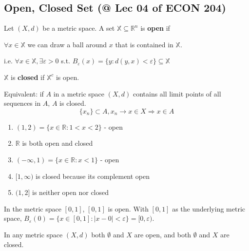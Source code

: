 \documentclass[11pt]{elegantbook}
\begin{document}
\subsection{Open, Closed Set \small{(@ Lec 04 of ECON 204)}}
\begin{definition}
    Let $(X, d)$ be a metric space. A set $\mathbb{X} \subseteq \mathbb{R}^{n}$ is \textbf{open} if
    
    $\forall x \in \mathbb{X}$ we can draw a ball around $x$ that is contained in $\mathbb{X}$.

    i.e. $\forall x \in \mathbb{X}, \exists \varepsilon>0$ s.t. $B_\varepsilon(x)=\{y:d(y,x)<\varepsilon\} \subseteq \mathbb{X}$
\end{definition}

\begin{definition}
    $\mathbb{X}$ is \textbf{closed} if $\mathbb{X}^c$ is open.
\end{definition}
\begin{theorem}
    Equivalent: if $A$ in a metric space $(X, d)$ contains all limit points of all sequences in $A$, $A$ is closed.
    $$\{x_n\}\subset A, x_n \rightarrow x\in X \Rightarrow x\in A$$
\end{theorem}
\begin{example}
\end{example}
\begin{enumerate}[1)]
    \item $(1,2)=\{x \in \mathbb{R}: 1<x<2\}$ - open
    \item $\mathbb{R}$ is both open and closed
    \item $(-\infty, 1)=\{x \in \mathbb{R}: x<1\}$ - open
    \item $[1, \infty)$ is closed because its complement open
    \item $(1,2]$ is neither open nor closed
\end{enumerate}

\begin{example}
    In the metric space $[0, 1]$, $[0, 1]$ is open. With $[0, 1]$ as the underlying metric space, $B_\varepsilon(0) = \{x \in [0, 1] : |x - 0| < \varepsilon\} = [0,\varepsilon)$.
\end{example}

\begin{theorem}
    In any metric space $(X, d)$ both $\emptyset$ and $X$ are open, and both $\emptyset$ and $X$ are closed.
\end{theorem}
\end{document}
